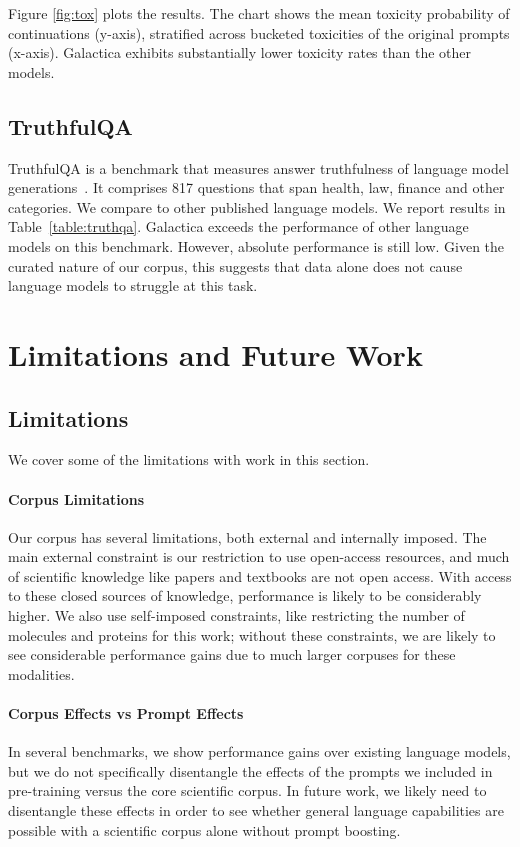 {Figure \ref{fig:tox} plots the results. The chart shows the mean toxicity probability of continuations (y-axis), stratified across bucketed toxicities of the original prompts (x-axis). Galactica exhibits substantially lower toxicity rates than the other models.

\subsection{TruthfulQA}

TruthfulQA is a benchmark that measures answer truthfulness of language model generations~\citep{TruthfulQA}. It comprises 817 questions that span health, law, finance and other categories. We compare to other published language models. We report results in Table~\ref{table:truthqa}. Galactica exceeds the performance of other language models on this benchmark. However, absolute performance is still low. Given the curated nature of our corpus, this suggests that data alone does not cause language models to struggle at this task.

\section{Limitations and Future Work}

\subsection{Limitations}

We cover some of the limitations with work in this section.

\paragraph{Corpus Limitations} Our corpus has several limitations, both external and internally imposed. The main external constraint is our restriction to use open-access resources, and much of scientific knowledge like papers and textbooks are not open access. With access to these closed sources of knowledge, performance is likely to be considerably higher. We also use self-imposed constraints, like restricting the number of molecules and proteins for this work; without these constraints, we are likely to see considerable performance gains due to much larger corpuses for these modalities.

\paragraph{Corpus Effects vs Prompt Effects} In several benchmarks, we show performance gains over existing language models, but we do not specifically disentangle the effects of the prompts we included in pre-training versus the core scientific corpus. In future work, we likely need to disentangle these effects in order to see whether general language capabilities are possible with a scientific corpus alone without prompt boosting.

}
